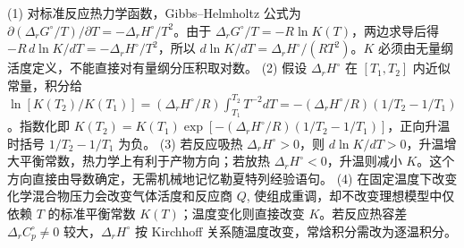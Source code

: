(1) 对标准反应热力学函数，Gibbs–Helmholtz 公式为 \(\partial(\Delta_rG^\circ/T)/\partial T=-\Delta_rH^\circ/T^2\)。由于 \(\Delta_rG^\circ/T=-R\ln K(T)\)，两边求导后得 \(-R\,d\ln K/dT=-\Delta_rH^\circ/T^2\)，所以 \(d\ln K/dT=\Delta_rH^\circ/(RT^2)\)。\(K\) 必须由无量纲活度定义，不能直接对有量纲分压积取对数。
(2) 假设 \(\Delta_rH^\circ\) 在 \([T_1,T_2]\) 内近似常量，积分给 \(\ln[K(T_2)/K(T_1)]=(\Delta_rH^\circ/R)\int_{T_1}^{T_2}T^{-2}dT=-(\Delta_rH^\circ/R)(1/T_2-1/T_1)\)。指数化即 \(K(T_2)=K(T_1)\exp[-(\Delta_rH^\circ/R)(1/T_2-1/T_1)]\)，正向升温时括号 \(1/T_2-1/T_1\) 为负。
(3) 若反应吸热 \(\Delta_rH^\circ>0\)，则 \(d\ln K/dT>0\)，升温增大平衡常数，热力学上有利于产物方向；若放热 \(\Delta_rH^\circ<0\)，升温则减小 \(K\)。这个方向直接由导数确定，无需机械地记忆勒夏特列经验语句。
(4) 在固定温度下改变化学混合物压力会改变气体活度和反应商 \(Q\), 使组成重调，却不改变理想模型中仅依赖 \(T\) 的标准平衡常数 \(K(T)\)；温度变化则直接改变 \(K\)。若反应热容差 \(\Delta_rC_p^\circ\ne0\) 较大，\(\Delta_rH^\circ\) 按 Kirchhoff 关系随温度改变，常焓积分需改为逐温积分。
